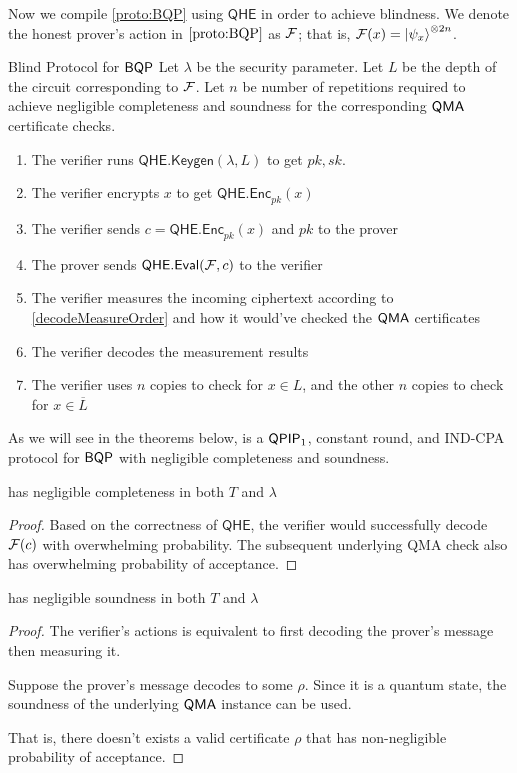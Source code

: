 Now we compile \cref{proto:BQP} using $\mathsf{QHE}$ in order to achieve blindness.
We denote the honest prover's action in $\cref{proto:BQP}$ as $\mathcal{F}$; that is, $\mathcal{F}(x)=\ket{\psi_x}^{\otimes 2n}$.

\begin{protocol}{Blind Protocol for $\operatorname{\mathsf{BQP}}$}
	\label{proto:BlindBQP}
	Let $\lambda$ be the security parameter.
	Let $L$ be the depth of the circuit corresponding to $\mathcal{F}$.
	Let $n$ be number of repetitions required to achieve negligible completeness and soundness for the corresponding $\operatorname{\mathsf{QMA}}$ certificate checks.
	\begin{enumerate}
		\item The verifier runs $\mathsf{QHE.Keygen}(\lambda, L)$ to get $pk, sk$.
		\item The verifier encrypts $x$ to get $\mathsf{QHE.Enc}_{pk}(x)$
		\item The verifier sends $c=\mathsf{QHE.Enc}_{pk}(x)$ and $pk$ to the prover
		\item The prover sends $\mathsf{QHE.Eval}(\mathcal{F}, c)$ to the verifier
		\item The verifier measures the incoming ciphertext according to \autoref{decodeMeasureOrder} and how it would've checked the $\operatorname{\mathsf{QMA}}$ certificates 
		\item The verifier decodes the measurement results
		\item The verifier uses $n$ copies to check for $x\in L$, and the other $n$ copies to check for $x\in\overline{L}$
	\end{enumerate}
\end{protocol}

As we will see in the theorems below,  is a $\operatorname{\mathsf{QPIP}}_1$, constant round, and IND-CPA protocol for $\operatorname{\mathsf{BQP}}$ with negligible completeness and soundness.

\begin{thm}
	 has negligible completeness in both $T$ and $\lambda$
\end{thm}
\begin{proof}
	Based on the correctness of $\mathsf{QHE}$, the verifier would successfully decode $\mathcal{F}(c)$ with overwhelming probability.
	The subsequent underlying QMA check also has overwhelming probability of acceptance.
\end{proof}

\begin{thm}
	 has negligible soundness in both $T$ and $\lambda$
\end{thm}
\begin{proof}
	The verifier's actions is equivalent to first decoding the prover's message then measuring it.

	Suppose the prover's message decodes to some $\rho$. Since it is a quantum state, the soundness of the underlying $\operatorname{\mathsf{QMA}}$ instance can be used.
	
	That is, there doesn't exists a valid certificate $\rho$ that has non-negligible probability of acceptance.
\end{proof}

